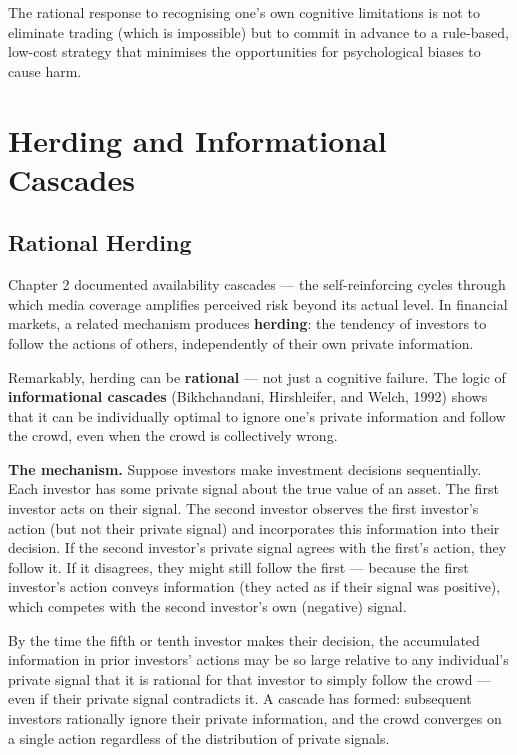 \documentclass[12pt, letterpaper]{article}
\begin{document}
The rational response to recognising one's own cognitive limitations is not to eliminate trading (which is impossible) but to commit in advance to a rule-based, low-cost strategy that minimises the opportunities for psychological biases to cause harm.

\medskip


\section{Herding and Informational Cascades}



\subsection{Rational Herding}


Chapter 2 documented availability cascades --- the self-reinforcing cycles through which media coverage amplifies perceived risk beyond its actual level. In financial markets, a related mechanism produces \textbf{herding}: the tendency of investors to follow the actions of others, independently of their own private information.

Remarkably, herding can be \textbf{rational} --- not just a cognitive failure. The logic of \textbf{informational cascades} (Bikhchandani, Hirshleifer, and Welch, 1992) shows that it can be individually optimal to ignore one's private information and follow the crowd, even when the crowd is collectively wrong.

\textbf{The mechanism.} Suppose investors make investment decisions sequentially. Each investor has some private signal about the true value of an asset. The first investor acts on their signal. The second investor observes the first investor's action (but not their private signal) and incorporates this information into their decision. If the second investor's private signal agrees with the first's action, they follow it. If it disagrees, they might still follow the first --- because the first investor's action conveys information (they acted as if their signal was positive), which competes with the second investor's own (negative) signal.

By the time the fifth or tenth investor makes their decision, the accumulated information in prior investors' actions may be so large relative to any individual's private signal that it is rational for that investor to simply follow the crowd --- even if their private signal contradicts it. A cascade has formed: subsequent investors rationally ignore their private information, and the crowd converges on a single action regardless of the distribution of private signals.
\end{document}
